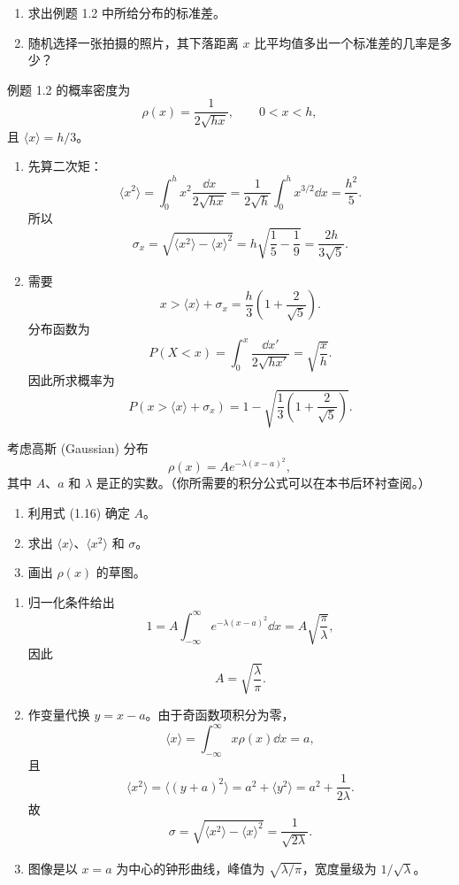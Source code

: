 \begin{question}
\begin{enumerate}
\item 求出例题 1.2 中所给分布的标准差。
\item 随机选择一张拍摄的照片，其下落距离 $x$ 比平均值多出一个标准差的几率是多少？
\end{enumerate}
\end{question}
\begin{solution}
例题 1.2 的概率密度为
\[
\rho(x)=\frac{1}{2\sqrt{hx}},\qquad 0<x<h,
\]
且 $\langle x\rangle=h/3$。
\begin{enumerate}
\item 先算二次矩：
\[
\langle x^2\rangle=\int_0^h x^2\frac{\dd x}{2\sqrt{hx}}
=\frac{1}{2\sqrt h}\int_0^h x^{3/2}\dd x
=\frac{h^2}{5}.
\]
所以
\[
\sigma_x=\sqrt{\langle x^2\rangle-\langle x\rangle^2}
=h\sqrt{\frac15-\frac19}=\frac{2h}{3\sqrt5}.
\]
\item 需要
\[
x>\langle x\rangle+\sigma_x=\frac{h}{3}\left(1+\frac{2}{\sqrt5}\right).
\]
分布函数为
\[
P(X<x)=\int_0^x \frac{\dd x'}{2\sqrt{hx'}}=\sqrt{\frac{x}{h}}.
\]
因此所求概率为
\[
P\left(x>\langle x\rangle+\sigma_x\right)
=1-\sqrt{\frac13\left(1+\frac{2}{\sqrt5}\right)}.
\]
\end{enumerate}
\end{solution}

\begin{question}
考虑高斯 (Gaussian) 分布
\[
\rho(x)=A e^{-\lambda (x-a)^2},
\]
其中 $A$、$a$ 和 $\lambda$ 是正的实数。（你所需要的积分公式可以在本书后环衬查阅。）
\begin{enumerate}
\item 利用式 (1.16) 确定 $A$。
\item 求出 $\langle x\rangle$、$\langle x^2\rangle$ 和 $\sigma$。
\item 画出 $\rho(x)$ 的草图。
\end{enumerate}

\par\smallskip
{}

\end{question}
\begin{solution}
\begin{enumerate}
\item 归一化条件给出
\[
1=A\int_{-\infty}^{\infty}e^{-\lambda(x-a)^2}\dd x
=A\sqrt{\frac{\pi}{\lambda}},
\]
因此
\[
A=\sqrt{\frac{\lambda}{\pi}}.
\]
\item 作变量代换 $y=x-a$。由于奇函数项积分为零，
\[
\langle x\rangle=\int_{-\infty}^{\infty}x\rho(x)\dd x=a,
\]
且
\[
\langle x^2\rangle=\langle (y+a)^2\rangle
=a^2+\langle y^2\rangle
=a^2+\frac{1}{2\lambda}.
\]
故
\[
\sigma=\sqrt{\langle x^2\rangle-\langle x\rangle^2}=\frac{1}{\sqrt{2\lambda}}.
\]
\item 图像是以 $x=a$ 为中心的钟形曲线，峰值为 $\sqrt{\lambda/\pi}$，宽度量级为 $1/\sqrt{\lambda}$。
\end{enumerate}
\end{solution}

